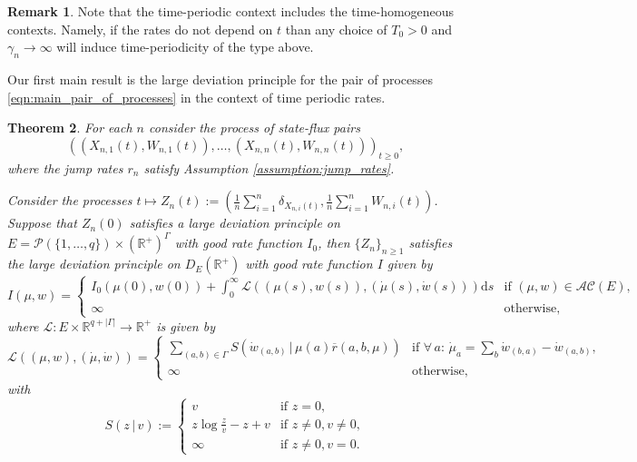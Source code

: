 \documentclass[a4paper]{article}
\newcommand{\cA}{\mathcal{A}}
\newcommand{\cC}{\mathcal{C}}
\newcommand{\cL}{\mathcal{L}}
\newcommand{\cP}{\mathcal{P}}
\newcommand{\bR}{\mathbb{R}}
\newcommand{\dd}{ \mathrm{d}}
\numberwithin{equation}{section}
\newtheorem{theorem}{Theorem}[section]
\theoremstyle{definition}
\newtheorem{remark}[theorem]{Remark}
\begin{document}
\begin{remark}
	Note that the time-periodic context includes the time-homogeneous contexts. Namely, if the rates do not depend on $t$ than any choice of $T_0 > 0$ and $\gamma_n \rightarrow \infty$ will induce time-periodicity of the type above.
\end{remark}


Our first main result is the large deviation principle for the pair of processes \eqref{eqn:main_pair_of_processes}  in the context of time periodic rates. 





\begin{theorem} \label{theorem:ldp_mean_field_jump_process_periodic}
	For each $n$ consider the process of state-flux pairs 
	\begin{equation*}
		((X_{n,1}(t),W_{n,1}(t)),\dots,(X_{n,n}(t),W_{n,n}(t)))_{t \geq 0},
	\end{equation*} 
	where the jump rates $r_n$ satisfy Assumption \ref{assumption:jump_rates}.
	
	\smallskip
	
	Consider the processes $t \mapsto Z_n(t) := \left(\frac{1}{n} \sum_{i=1}^n \delta_{X_{n,i}(t)},\frac{1}{n} \sum_{i=1}^n W_{n,i}(t)\right)$. Suppose that $Z_n(0)$ satisfies a large deviation principle on $E = \cP(\{1,\dots,q\}) \times (\bR^+)^\Gamma$ with good rate function $I_0$,  then $\{Z_n\}_{n \geq 1}$ satisfies the large deviation principle on $D_{E}(\bR^+)$ with good rate function $I$ 
	given by
	\begin{equation*}
		I(\mu,w) = 
		\begin{cases}
			I_0(\mu(0),w(0)) + \int_0^\infty \cL((\mu(s),w(s)),(\dot{\mu}(s),\dot{w}(s))) \dd s & \text{if } (\mu,w) \in \cA\cC(E), \\
			\infty & \text{otherwise},
		\end{cases}
	\end{equation*}
	where $\cL : E \times \bR^{q + |\Gamma|} \rightarrow \bR^+$ is given by
	\begin{equation*}
		\cL\left((\mu,w),(\dot{\mu},\dot{w})\right) = \begin{cases}
			\sum_{(a,b) \in \Gamma} S(\dot{w}_{(a,b)} \, | \, \mu(a) \overline{r}(a,b,\mu))  & \text{if } \forall \, a: \, \dot{\mu}_a = \sum_b \dot{w}_{(b,a)} - \dot{w}_{(a,b)}, \\
			\infty & \text{otherwise},
		\end{cases}
	\end{equation*}
	with 
	\begin{equation*}
		S(z \, | \, v) := \begin{cases}
			v & \text{if } z = 0, \\
			z \log \frac{z}{v} - z + v & \text{if } z \neq 0, v \neq 0, \\
			\infty & \text{if } z \neq 0, v = 0.
		\end{cases}
	\end{equation*}
	

\end{theorem}
\end{document}
